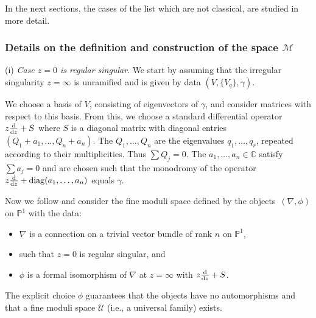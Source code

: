 \documentclass[pdftex]{sigma}
\numberwithin{equation}{section}
\begin{document}
In the next sections, the cases of the list which are not classical, are studied in more detail.

\subsubsection[Details on the definition and construction of the space M]{Details on the definition and construction of the space $\boldsymbol{\mathcal{M}}$}

 (i) \label{(i)} {\it Case $z=0$ is regular singular}. We start by assuming that the irregular singularity $z=\infty$ is unramified and is
given by data $(V, \{V_q\}, \gamma)$.

We choose a basis of $V$, consisting of eigenvectors of $\gamma$, and consider matrices with respect to this basis.
From this, we choose a standard differential operator $z\frac{{\rm d}}{{\rm d}z}+S$ where $S$ is a diagonal matrix with
diagonal entries $( Q_1+a_1,\dots ,Q_n+a_n )$. The $Q_1,\dots ,Q_n$ are the eigenvalues $q_1,\dots ,q_r$, repeated according to their multiplicities. Thus $\sum Q_j=0$. The $a_1,\dots ,a_n \in \mathbb{C}$ satisfy $\sum a_j=0$ and are chosen such that the monodromy of the operator $z\frac{{\rm d}}{{\rm d}z}+\operatorname{diag}(a_1,\dots ,a_n)$ equals $\gamma$.

Now we follow \cite[Section~12]{vdP-Si} and consider the fine moduli space defined by the objects~$(\nabla, \phi)$ on $\mathbb{P}^1$
with the data:
\begin{itemize}\itemsep=0pt
\item[(a)] $\nabla$ is a connection on a trivial vector bundle of rank $n$ on $\mathbb{P}^1$,
\item[(b)] such that $z=0$ is regular singular, and
\item[(c)] $\phi$ is a formal isomorphism of $\nabla$ at $z=\infty$ with $z\frac{{\rm d}}{{\rm d}z}+S$.
\end{itemize}
The explicit choice $\phi$ guarantees that the objects have no automorphisms and that a fine moduli space $\mathcal{U}$
(i.e., a universal family) exists.
\end{document}
